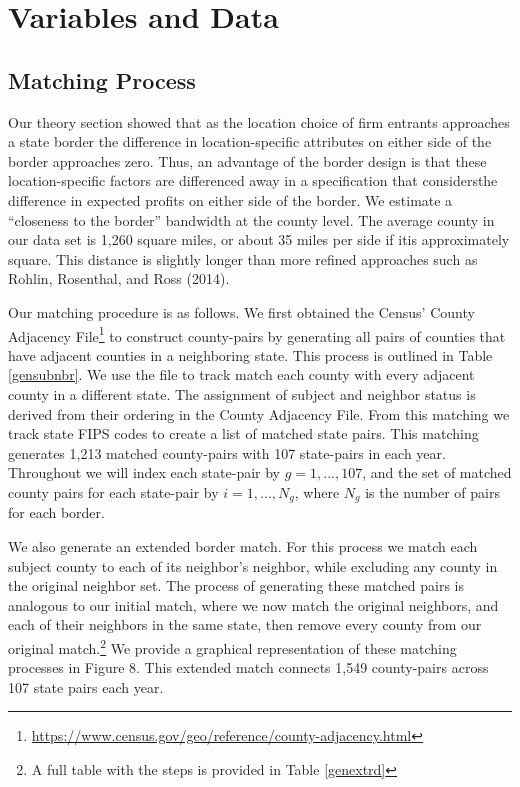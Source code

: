 \section{Variables and Data}

\subsection{Matching Process}

Our theory section showed that as the location choice of firm entrants approaches a state border the  difference in location-specific attributes on either side of the border approaches zero.  Thus, an advantage of the border design is that these location-specific factors are differenced away in a specification that considersthe difference in expected profits on either side of the border.  We estimate a “closeness to the border” bandwidth at the county level. The average county in our data set is 1,260 square miles, or about 35 miles per side if itis approximately square. This distance is slightly longer than more refined approaches such as Rohlin, Rosenthal, and Ross (2014). 

Our matching procedure is as follows. We first obtained the Census' County Adjacency File\footnote{\url{https://www.census.gov/geo/reference/county-adjacency.html}} to construct county-pairs by generating all pairs of counties that have adjacent counties in a neighboring state. This process is outlined in Table \ref{gensubnbr}. We use the file to track match each county with every adjacent county in a different state. The assignment of subject and neighbor status is derived from their ordering in the County Adjacency File. From this matching we track state FIPS codes to create a list of matched state pairs. This matching generates 1,213 matched county-pairs with 107 state-pairs in each year. Throughout we will index each state-pair by $g = 1,...,107$, and the set of matched county pairs for each state-pair by $i = 1,...,N_{g}$, where $N_g$ is the number of pairs for each border.

We also generate an extended border match. For this process we match each subject county to each of its neighbor’s neighbor, while excluding any county in the original neighbor set. The process of generating these matched pairs is analogous to our initial match, where we now match the original neighbors, and each of their neighbors in the same state, then remove every county from our original match.\footnote{A full table with the steps is provided in Table \ref{genextrd}} We provide a graphical representation of these matching processes in Figure 8. This extended match connects 1,549 county-pairs across 107 state pairs each year. 

